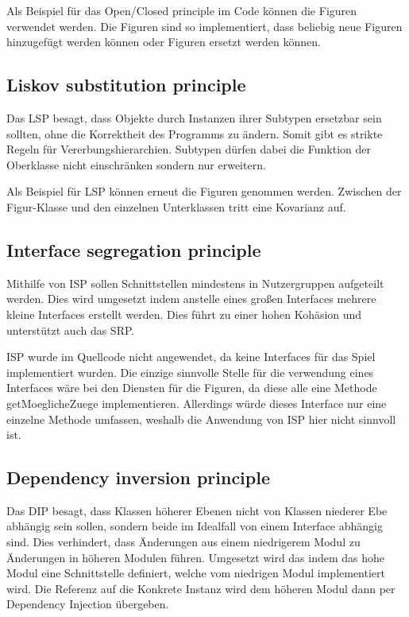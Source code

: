 Als Beispiel für das Open/Closed principle im Code können die Figuren verwendet werden. Die Figuren sind so implementiert, dass beliebig neue Figuren hinzugefügt werden können oder Figuren ersetzt werden können.
\subsection{Liskov substitution principle}
Das LSP besagt, dass Objekte durch Instanzen ihrer Subtypen ersetzbar sein sollten, ohne die Korrektheit des Programms zu ändern. Somit gibt es strikte Regeln für Vererbungshierarchien. Subtypen dürfen dabei die Funktion der Oberklasse nicht einschränken sondern nur erweitern.

Als Beispiel für LSP können erneut die Figuren genommen werden. Zwischen der Figur-Klasse und den einzelnen Unterklassen tritt eine Kovarianz auf.


\subsection{Interface segregation principle}
Mithilfe von ISP sollen Schnittstellen mindestens in Nutzergruppen aufgeteilt werden. Dies wird umgesetzt indem anstelle eines großen Interfaces mehrere kleine Interfaces erstellt werden. Dies führt zu einer hohen Kohäsion und unterstützt auch das SRP. 

ISP wurde im Quellcode nicht angewendet, da keine Interfaces für das Spiel implementiert wurden. Die einzige sinnvolle Stelle für die verwendung eines Interfaces wäre bei den Diensten für die Figuren, da diese alle eine Methode getMoeglicheZuege implementieren. Allerdings würde dieses Interface nur eine einzelne Methode umfassen, weshalb die Anwendung von ISP hier nicht sinnvoll ist.

\subsection{Dependency inversion principle}
Das DIP besagt, dass Klassen höherer Ebenen nicht von Klassen niederer Ebe abhängig sein sollen, sondern beide im Idealfall von einem Interface abhängig sind. Dies verhindert, dass Änderungen aus einem niedrigerem Modul zu Änderungen in höheren Modulen führen. Umgesetzt wird das indem das hohe Modul eine Schnittstelle definiert, welche vom niedrigen Modul implementiert wird. Die Referenz auf die Konkrete Instanz wird dem höheren Modul dann per Dependency Injection übergeben. 

